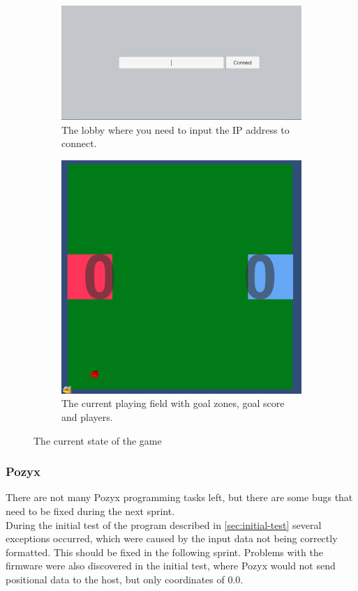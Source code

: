 \begin{figure}[H]
    \centering
    \begin{subfigure}{.5\textwidth}
        \centering
        \includegraphics[width=1\linewidth]{figures/sprint-4-lobby.PNG}
        \caption{The lobby where you need to input the IP address to connect.}
        \label{fig:sprint-4-lobby}
    \end{subfigure}
    \begin{subfigure}{.4\textwidth}
        \centering
        \includegraphics[width=.8\linewidth]{figures/sprint-4-game.PNG}
        \caption{The current playing field with goal zones, goal score and players.}
        \label{fig:sprint-4-game}
    \end{subfigure}
    \caption{The current state of the game}
    \label{fig:sprint-4-state-of-game}
\end{figure}

\subsubsection{Pozyx}
There are not many Pozyx programming tasks left, but there are some bugs that need to be fixed during the next sprint.
\\
During the initial test of the program described in \autoref{sec:initial-test} several exceptions occurred, which were caused by the input data not being correctly formatted.
This should be fixed in the following sprint.
Problems with the firmware were also discovered in the initial test, where Pozyx would not send positional data to the host, but only coordinates of $0.0$.

